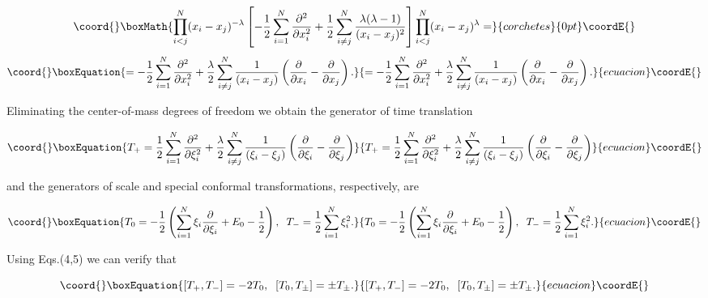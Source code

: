 \documentclass[a4paper,preprint,aps]{revtex4}
\begin{document}
\[\coord{}\boxMath{	\prod_{i<j}^{N}(x_{i}-x_{j})^{-\lambda}
	\left[
	- \frac{1}{2} \sum_{i=1}^{N} \frac {\partial ^{2}}{\partial x_{i}^2} +
	\frac{1}{2} \sum_{i\neq j}^{N} 
	\frac {\lambda(\lambda-1)}{(x_{i}-x_{j})^{2}}
	\right]
	\prod_{i<j}^{N}(x_{i}-x_{j})^{\lambda}=}{corchetes}{0pt}\coordE{}\]
\begin{equation}\coord{}\boxEquation{
	= -\frac{1}{2} \sum_{i=1}^{N} \frac {\partial ^{2}}{\partial x_{i}^2} +
	\frac{\lambda}{2} \sum_{i\neq j}^{N} \frac {1}{(x_{i}-x_{j})}
	\left(
	\frac{\partial}{\partial x_{i}}-\frac {\partial}{\partial x_{j}}
	\right) .
}{
	= -\frac{1}{2} \sum_{i=1}^{N} \frac {\partial ^{2}}{\partial x_{i}^2} +
	\frac{\lambda}{2} \sum_{i\neq j}^{N} \frac {1}{(x_{i}-x_{j})}
	\left(
	\frac{\partial}{\partial x_{i}}-\frac {\partial}{\partial x_{j}}
	\right) .
}{ecuacion}\coordE{}\end{equation}

Eliminating the center-of-mass degrees of freedom we obtain the generator of
 time translation


\begin{equation}\coord{}\boxEquation{
	T_{+}=
	 \frac{1}{2} \sum_{i=1}^{N} \frac {\partial ^{2}}{\partial \xi_{i}^2} +
	\frac{\lambda}{2} \sum_{i\neq j}^{N} \frac {1}{(\xi_{i}-\xi_{j})}
	\left(
	\frac{\partial}{\partial \xi_{i}}-\frac {\partial}{\partial \xi_{j}}
	\right)
}{
	T_{+}=
	 \frac{1}{2} \sum_{i=1}^{N} \frac {\partial ^{2}}{\partial \xi_{i}^2} +
	\frac{\lambda}{2} \sum_{i\neq j}^{N} \frac {1}{(\xi_{i}-\xi_{j})}
	\left(
	\frac{\partial}{\partial \xi_{i}}-\frac {\partial}{\partial \xi_{j}}
	\right)
}{ecuacion}\coordE{}\end{equation}

and the generators of scale and special conformal transformations,
 respectively, are

\begin{equation}\coord{}\boxEquation{
	T_{0}=-\frac{1}{2}
	\left(
	\sum_{i=1}^{N} \xi_{i} \frac {\partial}
	{\partial \xi_{i}}+E_{0}-\frac{1}{2}
	\right),\;\;
	 T_{-}=\frac{1}{2}\sum_{i=1}^{N} \xi_{i}^{2}.
}{
	T_{0}=-\frac{1}{2}
	\left(
	\sum_{i=1}^{N} \xi_{i} \frac {\partial}
	{\partial \xi_{i}}+E_{0}-\frac{1}{2}
	\right),\;\;
	 T_{-}=\frac{1}{2}\sum_{i=1}^{N} \xi_{i}^{2}.
}{ecuacion}\coordE{}\end{equation}

Using Eqs.(4,5) we can verify that


\begin{equation}\coord{}\boxEquation{
	[T_{+},T_{-}]=-2T_{0},\;\; [T_{0},T_{\pm}]=\pm T_{\pm}.
}{
	[T_{+},T_{-}]=-2T_{0},\;\; [T_{0},T_{\pm}]=\pm T_{\pm}.
}{ecuacion}\coordE{}\end{equation}
\end{document}
